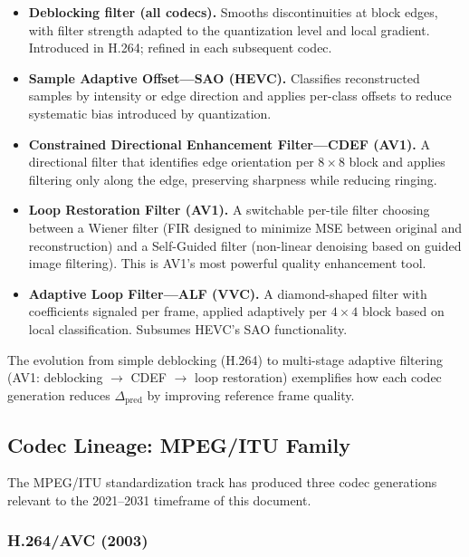 \begin{itemize}
\item \textbf{Deblocking filter (all codecs).} Smooths discontinuities
  at block edges, with filter strength adapted to the quantization level
  and local gradient. Introduced in H.264; refined in each subsequent
  codec.

\item \textbf{Sample Adaptive Offset---SAO (HEVC).} Classifies
  reconstructed samples by intensity or edge direction and applies
  per-class offsets to reduce systematic bias introduced by quantization.

\item \textbf{Constrained Directional Enhancement Filter---CDEF (AV1).}
  A directional filter that identifies edge orientation per
  $8\!\times\!8$ block and applies filtering only along the edge,
  preserving sharpness while reducing ringing.

\item \textbf{Loop Restoration Filter (AV1).} A switchable per-tile
  filter choosing between a Wiener filter (FIR designed to minimize MSE
  between original and reconstruction) and a Self-Guided filter (non-linear
  denoising based on guided image filtering). This is AV1's most powerful
  quality enhancement tool.

\item \textbf{Adaptive Loop Filter---ALF (VVC).} A diamond-shaped filter
  with coefficients signaled per frame, applied adaptively per
  $4\!\times\!4$ block based on local classification. Subsumes HEVC's
  SAO functionality.
\end{itemize}

The evolution from simple deblocking (H.264) to multi-stage adaptive
filtering (AV1: deblocking $\to$ CDEF $\to$ loop restoration) exemplifies
how each codec generation reduces $\Delta_{\text{pred}}$ by improving
reference frame quality.

\subsection{Codec Lineage: MPEG/ITU Family}
\label{sec:mpeg-lineage}

The MPEG/ITU standardization track has produced three codec generations
relevant to the 2021--2031 timeframe of this document.

\subsubsection{H.264/AVC (2003)}
\label{sec:h264}

